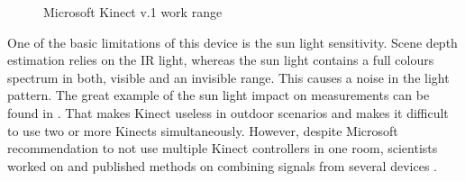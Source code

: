 \documentclass{llncs}
\begin{document}
\begin{figure}[h!]
{
	}
	\caption{Microsoft Kinect v.1 work range}
	\label{fig:characteristics:kinect:range}
\end{figure}
		
		
One of the basic limitations of this device is the sun light sensitivity. Scene depth estimation relies on the IR light, whereas the sun light contains a full colours spectrum in both, visible and an invisible range. This causes a noise in the light pattern. The great example of the sun light impact on measurements can be found in \cite{Suarez2012}. That makes Kinect useless in outdoor scenarios and makes it difficult to use two or more Kinects simultaneously. However, despite Microsoft recommendation to not use multiple Kinect controllers in one room, scientists worked on and published methods on combining signals from several devices \cite{Kitsikidis2011,Asteriadis2013,Schroder2011}.
\end{document}
